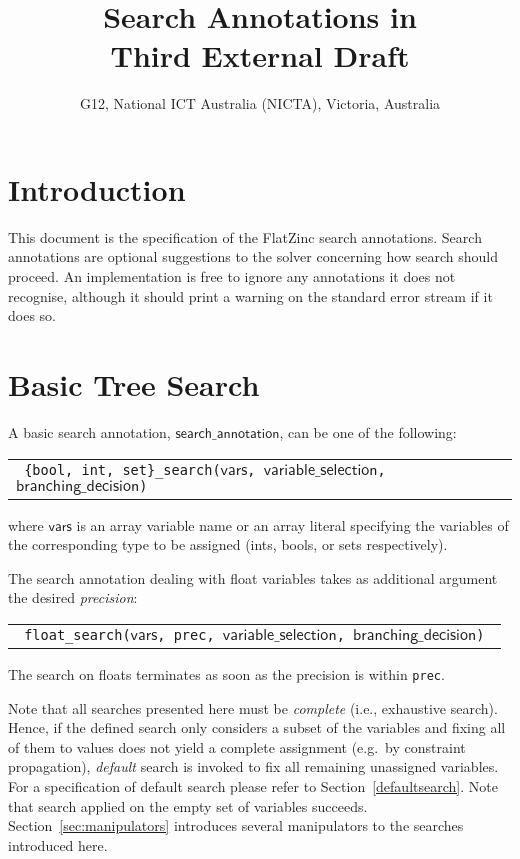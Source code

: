 \documentclass[a4paper]{article}
\title{Search Annotations in \flatzinc\\
\smallskip
\Large{\textbf{Third External Draft}}
}
\author{G12, National ICT Australia (NICTA), Victoria, Australia}
\date{}
\newcommand{\flatzinc}		{Flat\-Zinc}
\newcommand{\fz}[1]{\texttt{#1}}
\newcommand{\fzsf}[1]{\ensuremath{\mathsf{#1}}}
\newcommand{\fzvars}{\fzsf{vars}}
\newcommand{\fzsearchannotation}{\fzsf{search\_annotation}}
\newcommand{\fzvarchoiceannotation}{\fzsf{variable\_selection}}
\newcommand{\fznassignmentannotation}{\fzsf{branching\_decision}}
\begin{document}
\maketitle


\tableofcontents

\newpage

\section{Introduction}

This document is the specification of the \flatzinc{} search annotations.
Search annotations are optional suggestions to the solver concerning how search
should proceed.  An implementation is free to ignore any annotations it does
not recognise, although it should print a warning on the standard error stream
if it does so.

\section{Basic Tree Search}
\label{sec:basic}

A basic search annotation, \fzsearchannotation{}, can be one of the following:

\begin{tabular}{l}
\fz{
\{bool, int, set\}\_search(\fzvars, \fzvarchoiceannotation, \fznassignmentannotation)}
\end{tabular}

where \fzvars{} is an array variable name or an array literal specifying the
variables of the corresponding type to be assigned (ints, bools, or sets
respectively).

The search annotation dealing with float variables takes as additional argument the desired \emph{precision}:

\begin{tabular}{l}
\fz{
float\_search(\fzvars, prec, \fzvarchoiceannotation, \fznassignmentannotation)
}
\end{tabular}

The search on floats terminates as soon as the precision is within \texttt{prec}.

Note that all searches presented here must be \emph{complete} (i.e., exhaustive search). Hence, if the defined search only considers a subset of the variables and
fixing all of them to values does not yield a complete assignment (e.g.\ by
constraint propagation), \emph{default} search is invoked to fix all remaining
unassigned variables.  For a specification of default search please refer to
Section~\ref{defaultsearch}. Note that search applied on the empty set of variables 
succeeds. Section~\ref{sec:manipulators} introduces several manipulators to the searches introduced here. 
\end{document}
